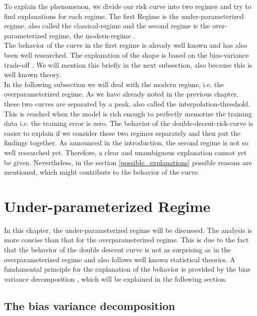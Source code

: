 To explain the phenomenon, we divide our risk curve into two regimes and try to find explanations for each regime. The first Regime is the under-parameterized regime, also called the classical-regime \cite{belkin} and the second regime is the over-parameterized regime, the modern-regime \cite{belkin}.\\
The behavior of the curve in the first regime is already well known and has also been well researched. The explanation of the shape is based on the bias-variance trade-off \cite{belkin}. We will mention this briefly in the next subsection, also because this is well known theory.\\
In the following subsection we will deal with the modern regime, i.e. the overparameterized regime. As we have already noted in the previous chapter, these two curves are separated by a peak, also called the interpolation-threshold. This is reached when the model is rich enough to perfectly memorize the training data i.e. the training error is zero. The behavior of the double-decent-risk-curve is easier to explain if we consider these two regimes separately and then put the findings together. As announced in the introduction, the second regime is not so well researched yet. Therefore, a clear and unambiguous explanation cannot yet be given. Nevertheless, in the section \ref{possible_explanations} possible reasons are mentioned, which might contribute to the behavior of the curve.  


\newpage
\section{Under-parameterized Regime}
\label{under_para}

In this chapter, the under-parameterized regime will be discussed. The analysis is more concise than that for the overparameterized regime. This is due to the fact that the behavior of the double descent curve is not as surprising as in the overparameterized regime and also follows well known statistical theories. A fundamental principle for the explanation of the behavior is provided by the bias variance decomposition \cite{belkin}, which will be explained in the following section.  

\subsection{The bias variance decomposition}
\label{bias_variance_chapter}

